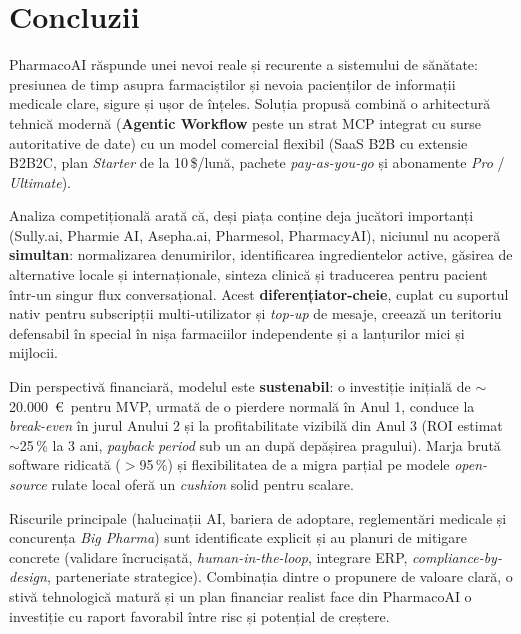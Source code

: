 \section{Concluzii}

PharmacoAI răspunde unei nevoi reale și recurente a sistemului de sănătate: presiunea de timp asupra farmaciștilor și nevoia pacienților de informații medicale clare, sigure și ușor de înțeles. Soluția propusă combină o arhitectură tehnică modernă (\textbf{Agentic Workflow} peste un strat MCP integrat cu surse autoritative de date) cu un model comercial flexibil (SaaS B2B cu extensie B2B2C, plan \textit{Starter} de la 10\,\$/lună, pachete \textit{pay-as-you-go} și abonamente \textit{Pro} / \textit{Ultimate}).

Analiza competițională arată că, deși piața conține deja jucători importanți (Sully.ai, Pharmie AI, Asepha.ai, Pharmesol, PharmacyAI), niciunul nu acoperă \textbf{simultan}: normalizarea denumirilor, identificarea ingredientelor active, găsirea de alternative locale și internaționale, sinteza clinică și traducerea pentru pacient într-un singur flux conversațional. Acest \textbf{diferențiator-cheie}, cuplat cu suportul nativ pentru subscripții multi-utilizator și \textit{top-up} de mesaje, creează un teritoriu defensabil în special în nișa farmaciilor independente și a lanțurilor mici și mijlocii.

Din perspectivă financiară, modelul este \textbf{sustenabil}: o investiție inițială de $\sim$20.000~\euro\ pentru MVP, urmată de o pierdere normală în Anul 1, conduce la \textit{break-even} în jurul Anului 2 și la profitabilitate vizibilă din Anul 3 (ROI estimat $\sim$25\,\% la 3 ani, \textit{payback period} sub un an după depășirea pragului). Marja brută software ridicată ($>$95\,\%) și flexibilitatea de a migra parțial pe modele \textit{open-source} rulate local oferă un \textit{cushion} solid pentru scalare.

Riscurile principale (halucinații AI, bariera de adoptare, reglementări medicale și concurența \textit{Big Pharma}) sunt identificate explicit și au planuri de mitigare concrete (validare încrucișată, \textit{human-in-the-loop}, integrare ERP, \textit{compliance-by-design}, parteneriate strategice). Combinația dintre o propunere de valoare clară, o stivă tehnologică matură și un plan financiar realist face din PharmacoAI o investiție cu raport favorabil între risc și potențial de creștere.
